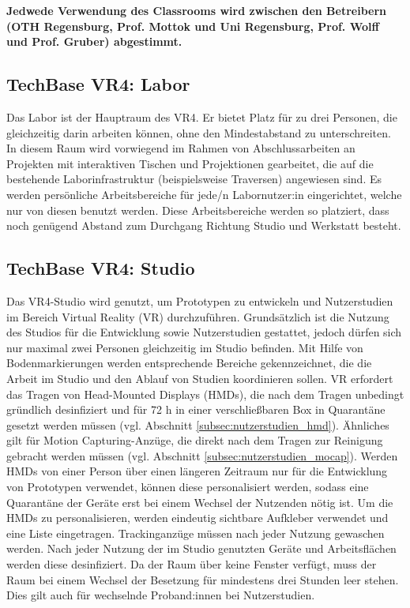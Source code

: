 \noindent
\textbf{Jedwede Verwendung des Classrooms wird zwischen den Betreibern (OTH Regensburg, Prof. Mottok und Uni Regensburg, Prof. Wolff und Prof. Gruber) abgestimmt.}

\subsection{TechBase VR4: Labor}\label{subsec:labore_vr4_labor}


\noindent
Das Labor ist der Hauptraum des VR4. Er bietet Platz für zu drei Personen, die gleichzeitig darin arbeiten können, ohne den Mindestabstand zu unterschreiten. In diesem Raum wird vorwiegend im Rahmen von Abschlussarbeiten an Projekten mit interaktiven Tischen und Projektionen gearbeitet, die auf die bestehende Laborinfrastruktur (beispielsweise Traversen) angewiesen sind.
Es werden persönliche Arbeitsbereiche für jede/n Labornutzer:in eingerichtet, welche nur von diesen benutzt werden.
Diese Arbeitsbereiche werden so platziert, dass noch genügend Abstand zum Durchgang Richtung Studio und Werkstatt besteht.

\subsection{TechBase VR4: Studio}\label{subsec:labore_vr4_stuio}


\noindent
Das VR4-Studio wird genutzt, um Prototypen zu entwickeln und Nutzerstudien im Bereich Virtual Reality (VR) durchzuführen.
Grundsätzlich ist die Nutzung des Studios für die Entwicklung sowie Nutzerstudien gestattet, jedoch dürfen sich nur maximal zwei Personen gleichzeitig im Studio befinden.
Mit Hilfe von Bodenmarkierungen werden entsprechende Bereiche gekennzeichnet, die die Arbeit im Studio und den Ablauf von Studien koordinieren sollen.
VR erfordert das Tragen von Head-Mounted Displays (HMDs), die nach dem Tragen unbedingt gründlich desinfiziert und für 72 h in einer verschließbaren Box in Quarantäne gesetzt werden müssen (vgl. Abschnitt \ref{subsec:nutzerstudien_hmd}).
Ähnliches gilt für Motion Capturing-Anzüge, die direkt nach dem Tragen zur Reinigung gebracht werden müssen (vgl. Abschnitt \ref{subsec:nutzerstudien_mocap}).
Werden HMDs von einer Person über einen längeren Zeitraum nur für die Entwicklung von Prototypen verwendet, können diese personalisiert werden, sodass eine Quarantäne der Geräte erst bei einem Wechsel der Nutzenden nötig ist.
Um die HMDs zu personalisieren, werden eindeutig sichtbare Aufkleber verwendet und eine Liste eingetragen.
Trackinganzüge müssen nach jeder Nutzung gewaschen werden.
Nach jeder Nutzung der im Studio genutzten Geräte und Arbeitsflächen werden diese desinfiziert.
Da der Raum über keine Fenster verfügt, muss der Raum bei einem Wechsel der Besetzung für mindestens drei Stunden leer stehen.
Dies gilt auch für wechselnde Proband:innen bei Nutzerstudien.

